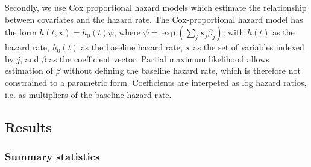 \documentclass[12pt]{article}
\begin{document}
Secondly, we use Cox proportional hazard models which estimate the relationship between covariates and the hazard rate.
The Cox-proportional hazard model has the form \(h(t,\mathbf{x}) = h_0(t) \psi\), where \(\psi = \exp(\sum_{j} \mathbf{x}_j \beta_j)\); with \(h(t)\) as the hazard rate, \(h_0(t)\) as the baseline hazard rate, \(\mathbf{x}\) as the set of variables indexed by \(j\), and \(\beta\) as the coefficient vector.
Partial maximum likelihood allows estimation of \(\beta\) without defining the baseline hazard rate, which is therefore not constrained to a parametric form. 
Coefficients are interpeted as log hazard ratios, i.e. as multipliers of the baseline hazard rate. 



\subsection*{Results}


\subsubsection*{Summary statistics}
\end{document}
